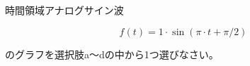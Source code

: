 時間領域アナログサイン波

\[
f(t) = 1 \cdot \sin( \pi \cdot t + \pi/2 )
\]

\bigskip
\noindent  のグラフを選択肢a〜dの中から1つ選びなさい。
